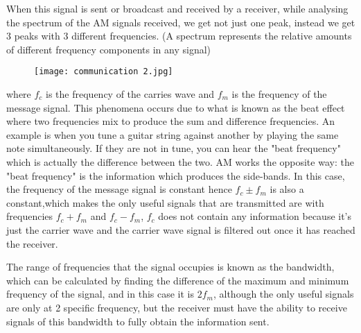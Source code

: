 \documentclass{article}
\begin{document}
When this signal is sent or broadcast and received by a receiver, while analysing the spectrum of the AM signals received, we get not just one peak, instead we get 3 peaks with 3 different frequencies. (A spectrum represents the relative amounts of different frequency components in any signal)
\begin{figure}[H]
    \centering
    \texttt{[image: communication 2.jpg]}
\end{figure}
where $f_c$ is the frequency of the carries wave and $f_m$ is the frequency of the message signal. This phenomena occurs due to what is known as the beat effect where two frequencies mix to produce the sum and difference frequencies. An example is when you tune a guitar string against another by playing the same note simultaneously. If they are not in tune, you can hear the "beat frequency" which is actually the difference between the two. AM works the opposite way: the "beat frequency" is the information which produces the side-bands. In this case, the frequency of the message signal is constant hence $f_c \pm f_m$ is also a constant,which makes the only useful signals that are transmitted are with frequencies $f_c+f_m$ and $f_c-f_m$, $f_c$ does not contain any information because it's just the carrier wave and the carrier wave signal is filtered out once it has reached the receiver. 

The range of frequencies that the signal occupies is known as the bandwidth, which can be calculated by finding the difference of the maximum and minimum frequency of the signal, and in this case it is $2f_m$, although the only useful signals are only at 2 specific frequency, but the receiver must have the ability to receive signals of this bandwidth to fully obtain the information sent.
\end{document}
